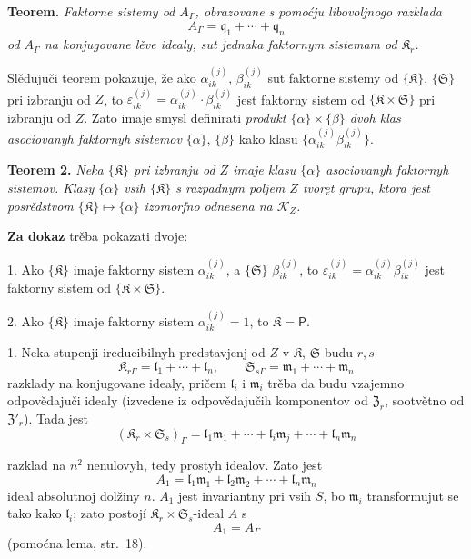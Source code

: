 \documentclass[11pt]{article}
\begin{document}
\textbf{Teorem.} \emph{Faktorne sistemy od \(A_\Gamma\), obrazovane s pomoćju libovoljnogo razklada}
\[
A_\Gamma=\mathfrak q_1+\cdots+\mathfrak q_n
\]
\emph{od \(A_\Gamma\) na konjugovane lěve idealy, sut jednaka faktornym sistemam od \(\mathfrak K_r\).}

Slědujuči teorem pokazuje, že ako \(\alpha_{ik}^{(j)}\), \(\beta_{ik}^{(j)}\) sut faktorne sistemy od \(\{\mathfrak K\}\), \(\{\mathfrak S\}\) pri izbranju od \(Z\), to \(\varepsilon_{ik}^{(j)}=\alpha_{ik}^{(j)}\cdot\beta_{ik}^{(j)}\) jest faktorny sistem od \(\{\mathfrak K\times\mathfrak S\}\) pri izbranju od \(Z\). Zato imaje smysl definirati \emph{produkt \(\{\alpha\}\times\{\beta\}\) dvoh klas asociovanyh faktornyh sistemov} \(\{\alpha\}\), \(\{\beta\}\) kako klasu \(\{\alpha_{ik}^{(j)}\beta_{ik}^{(j)}\}\).

\textbf{Teorem 2.} \emph{Neka \(\{\mathfrak K\}\) pri izbranju od \(Z\) imaje klasu \(\{\alpha\}\) asociovanyh faktornyh sistemov. Klasy \(\{\alpha\}\) vsih \(\{\mathfrak K\}\) s razpadnym poljem \(Z\) tvoręt grupu, ktora jest posrědstvom \(\{\mathfrak K\}\mapsto\{\alpha\}\) izomorfno odnesena na \(\mathscr K_Z\).}

\textbf{Za dokaz} trěba pokazati dvoje:

1. Ako \(\{\mathfrak K\}\) imaje faktorny sistem \(\alpha_{ik}^{(j)}\), a \(\{\mathfrak S\}\) \(\beta_{ik}^{(j)}\), to \(\varepsilon_{ik}^{(j)}=\alpha_{ik}^{(j)}\beta_{ik}^{(j)}\) jest faktorny sistem od \(\{\mathfrak K\times\mathfrak S\}\).

2. Ako \(\{\mathfrak K\}\) imaje faktorny sistem \(\alpha_{ik}^{(j)}=1\), to \(\mathfrak K=\mathsf P\).

1. Neka stupenji ireducibilnyh predstavjenj od \(Z\) v \(\mathfrak K\), \(\mathfrak S\) budu \(r,s\)
\[
\mathfrak K_{r\Gamma}=\mathfrak l_1+\cdots+\mathfrak l_n,\qquad
\mathfrak S_{s\Gamma}=\mathfrak m_1+\cdots+\mathfrak m_n
\]
razklady na konjugovane idealy, pričem \(\mathfrak l_i\) i \(\mathfrak m_i\) trěba da budu vzajemno odpovědajuči idealy (izvedene iz odpovědajučih komponentov od \(\mathfrak Z_r\), sootvětno od \(\mathfrak Z'_r\)). Tada jest
\[
(\mathfrak K_r\times\mathfrak S_s)_\Gamma
=\mathfrak l_1\mathfrak m_1+\cdots+\mathfrak l_i\mathfrak m_j+\cdots+\mathfrak l_n\mathfrak m_n
\]

razklad na \(n^2\) nenulovyh, tedy prostyh idealov. Zato jest
\[
A_1=\mathfrak l_1\mathfrak m_1+\mathfrak l_2\mathfrak m_2+\cdots+\mathfrak l_n\mathfrak m_n
\]
ideal absolutnoj dolžiny \(n\). \(A_1\) jest invariantny pri vsih \(S\), bo \(\mathfrak m_i\) transformujut se tako kako \(\mathfrak l_i\); zato postojí \(\mathfrak K_r\times\mathfrak S_s\)-ideal \(A\) s
\[
A_1=A_\Gamma
\]
(pomoćna lema, str.~18).
\end{document}
